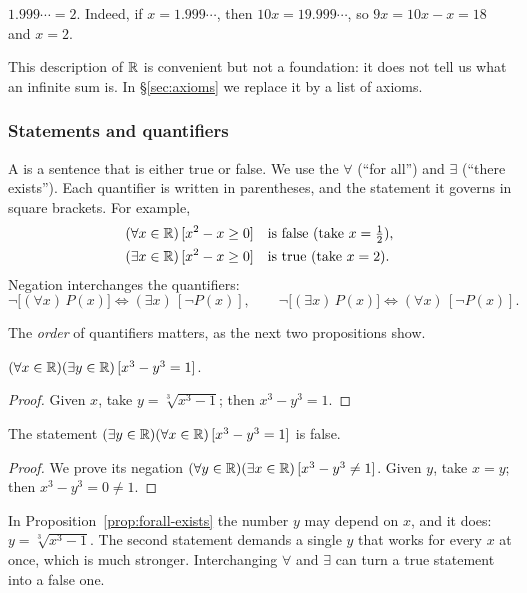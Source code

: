\begin{example}
    $1.999\cdots=2$. Indeed, if $x=1.999\cdots$, then $10x=19.999\cdots$, so
    $9x=10x-x=18$ and $x=2$.
\end{example}

This description of $\mathbb{R}$ is convenient but not a foundation: it does not
tell us what an infinite sum is. In \S\ref{sec:axioms} we replace it by a
list of axioms.

\subsubsection{Statements and quantifiers}
A  is a sentence that is either true or false. We use the
 $\forall$ (``for all'') and $\exists$ (``there
exists''). Each quantifier is written in parentheses, and the statement it
governs in square brackets. For example,
\begin{align*}
    (\forall x\in\mathbb{R})\,[x^2-x\geq 0] &\quad\text{is false (take } x=\tfrac12\text{)}, \\
    (\exists x\in\mathbb{R})\,[x^2-x\geq 0] &\quad\text{is true (take } x=2\text{)}.
\end{align*}
Negation interchanges the quantifiers:
\begin{equation*}
    \neg\bigl[(\forall x)\,P(x)\bigr]\iff (\exists x)\,[\neg P(x)],
    \qquad
    \neg\bigl[(\exists x)\,P(x)\bigr]\iff (\forall x)\,[\neg P(x)].
\end{equation*}

The \emph{order} of quantifiers matters, as the next two propositions show.

\begin{proposition}\label{prop:forall-exists}
    $(\forall x\in\mathbb{R})(\exists y\in\mathbb{R})\,[x^3-y^3=1]$.
\end{proposition}

\begin{proof}
    Given $x$, take $y=\sqrt[3]{x^3-1}$; then $x^3-y^3=1$.
\end{proof}

\begin{proposition}
    The statement $(\exists y\in\mathbb{R})(\forall x\in\mathbb{R})\,[x^3-y^3=1]$ is false.
\end{proposition}

\begin{proof}
    We prove its negation $(\forall y\in\mathbb{R})(\exists x\in\mathbb{R})\,[x^3-y^3\neq1]$.
    Given $y$, take $x=y$; then $x^3-y^3=0\neq1$.
\end{proof}

\begin{remark}
    In Proposition~\ref{prop:forall-exists} the number $y$ may depend on
    $x$, and it does: $y=\sqrt[3]{x^3-1}$. The second statement demands a
    single $y$ that works for every $x$ at once, which is much stronger.
    Interchanging $\forall$ and $\exists$ can turn a true statement into a
    false one.
\end{remark}
